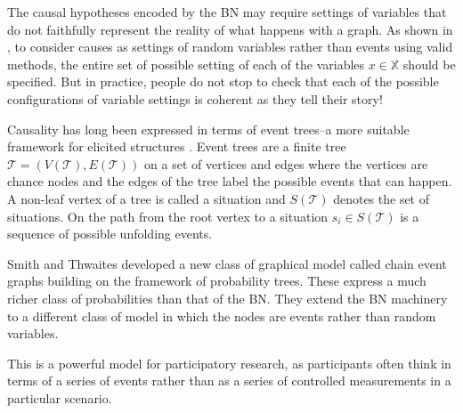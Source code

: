 \documentclass[12pt]{article}
\begin{document}
%
%
%


The causal hypotheses encoded by the BN may require settings of variables that do not faithfully represent the reality of what happens with a graph. As shown in \cite{SPIRTES}, to consider causes as settings of random variables rather than events using valid methods, the entire set of possible setting of each of the variables $x \in \mathbb{X}$ should be specified. But in practice, people do not stop to check that each of the possible configurations of variable settings is coherent as they tell their story! 


Causality has long been expressed in terms of event trees--a more suitable framework for elicited structures \cite{Shafer1996}.
Event trees are a finite tree $\mathcal{T} = (V(\mathcal{T}), E(\mathcal{T}))$ on a set of vertices and edges where the vertices are chance nodes and the edges of the tree label the possible events that can happen. A non-leaf vertex of a tree is called a situation and $S(\mathcal{T})$ denotes the set of situations. %
On the path from the root vertex to a situation $s_i \in S(\mathcal{T})$ is a sequence of possible unfolding events.

Smith and Thwaites developed a new class of graphical model called chain event graphs building on the framework of probability trees. These express a much richer class of probabilities than that of the BN. %
They extend the BN machinery to a different class of model in which the nodes are events rather than random variables.

This is a powerful model for participatory research, as participants often think in terms of a series of events rather than as a series of controlled measurements in a particular scenario. 
\end{document}

